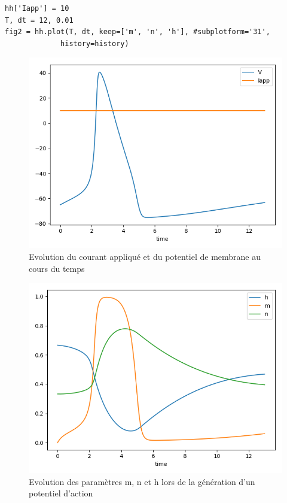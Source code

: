 \documentclass[12pt]{scrartcl}
\begin{document}
\clearpage 
\begin{lstlisting}[caption = {Simulation du modèle 5}]
hh['Iapp'] = 10
T, dt = 12, 0.01
fig2 = hh.plot(T, dt, keep=['m', 'n', 'h'], #subplotform='31', 
			 history=history)
\end{lstlisting}

\begin{figure}[!h]
\centering
\includegraphics[scale=0.5]{imgs/hh51.png}
\caption{Evolution du courant appliqué et du potentiel de membrane au cours du temps}
\label{hh51}
\end{figure}

\begin{figure}[!h]
\centering
\includegraphics[scale=0.5]{imgs/hh52.png}
\caption{Evolution des paramètres m, n et h lors de la génération d'un potentiel d'action}
\label{hh52}
\end{figure}
\end{document}
